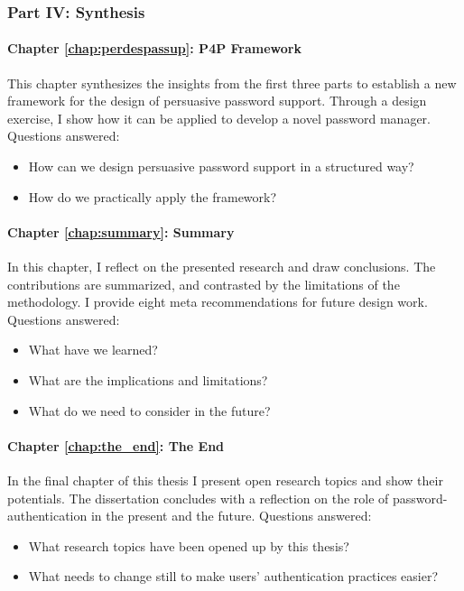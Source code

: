 \subsubsection{Part IV: Synthesis}
\paragraph{Chapter \ref{chap:perdespassup}: P4P Framework} %
This chapter synthesizes the insights from the first three parts to establish a new framework for the design of persuasive password support. Through a design exercise, I show how it can be applied to develop a novel password manager. 
Questions answered: \vspace*{-5pt} \begin{itemize}[leftmargin=*,itemsep=-5pt]
	\item How can we design persuasive password support in a structured way?
	\item How do we practically apply the framework?
\end{itemize}

\paragraph{Chapter \ref{chap:summary}: Summary} %
In this chapter, I reflect on the presented research and draw conclusions. The contributions are summarized, and contrasted by the limitations of the methodology. I provide eight meta recommendations for future design work. 
Questions answered: \vspace*{-5pt} \begin{itemize}[leftmargin=*,itemsep=-5pt]
	\item What have we learned?
	\item What are the implications and limitations?
	\item What do we need to consider in the future?
\end{itemize}

\paragraph{Chapter \ref{chap:the_end}: The End} %
In the final chapter of this thesis I present open research topics and show their potentials. The dissertation concludes with a reflection on the role of password-authentication in the present and the future. 
Questions answered: \vspace*{-5pt} \begin{itemize}[leftmargin=*,itemsep=-5pt]
	\item What research topics have been opened up by this thesis?
	\item What needs to change still to make users' authentication practices easier?
\end{itemize}
